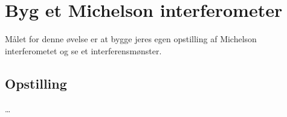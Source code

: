 \section{Byg et Michelson interferometer} \label{laserlab:sec:BygMichelsonInterferometer}

Målet for denne øvelse er at bygge jeres egen opstilling af Michelson interferometet og se et interferensmønster.

\subsection{Opstilling}

\ldots